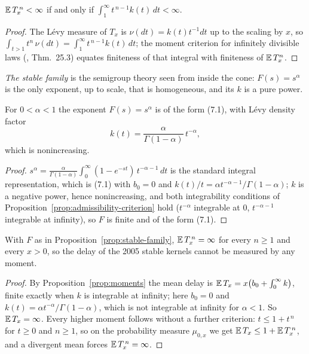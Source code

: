 \begin{proposition}\label{prop:moment-criterion}
$\mathbb{E}\,T_x^{\,n} < \infty$ if and only if $\int_1^\infty t^{\,n-1} k(t)\,dt < \infty$.
\end{proposition}

\begin{proof}
The Lévy measure of $T_x$ is $\nu(dt) = k(t)t^{-1}dt$ up to the scaling by $x$, so
$\int_{t>1} t^n\,\nu(dt) = \int_1^\infty t^{\,n-1}k(t)\,dt$; the moment criterion for
infinitely divisible laws (, Thm.~25.3) equates finiteness of that
integral with finiteness of $\mathbb{E}\,T_x^n$.
\end{proof}

\emph{The stable family} is the semigroup theory seen from inside the cone: $F(s) = s^\alpha$
is the only exponent, up to scale, that is homogeneous, and its $k$ is a pure power.

\begin{proposition}\label{prop:stable-family}
For $0 < \alpha < 1$ the exponent $F(s) = s^\alpha$ is of the form (7.1), with Lévy density
factor
\[
  k(t) = \frac{\alpha}{\Gamma(1-\alpha)}\, t^{-\alpha},
\]
which is nonincreasing.
\end{proposition}

\begin{proof}
$s^\alpha = \frac{\alpha}{\Gamma(1-\alpha)}\int_0^\infty (1 - e^{-st})\,t^{-\alpha-1}\,dt$ is
the standard integral representation, which is (7.1) with $b_0 = 0$ and
$k(t)/t = \alpha t^{-\alpha-1}/\Gamma(1-\alpha)$; $k$ is a negative power, hence
nonincreasing, and both integrability conditions of Proposition~\ref{prop:admissibility-criterion}
hold ($t^{-\alpha}$ integrable at $0$, $t^{-\alpha-1}$ integrable at infinity), so $F$ is finite
and of the form (7.1).
\end{proof}

\begin{proposition}\label{prop:stable-moments}
With $F$ as in Proposition~\ref{prop:stable-family}, $\mathbb{E}\,T_x^{\,n} = \infty$ for every $n \ge 1$
and every $x > 0$, so the delay of the 2005 stable kernels cannot be measured by any moment.
\end{proposition}

\begin{proof}
By Proposition~\ref{prop:moments} the mean delay is $\mathbb{E}\,T_x = x\bigl(b_0 + \int_0^\infty
k\bigr)$, finite exactly when $k$ is integrable at infinity; here $b_0 = 0$ and
$k(t) = \alpha t^{-\alpha}/\Gamma(1 - \alpha)$, which is not integrable at infinity for
$\alpha < 1$. So $\mathbb{E}\,T_x = \infty$. Every higher moment follows without a further criterion:
$t \le 1 + t^{\,n}$ for $t \ge 0$ and $n \ge 1$, so on the probability measure $\mu_{0,x}$ we get
$\mathbb{E}\,T_x \le 1 + \mathbb{E}\,T_x^{\,n}$, and a divergent mean forces $\mathbb{E}\,T_x^{\,n} = \infty$.
\end{proof}

